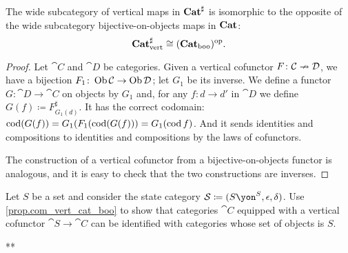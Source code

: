 \documentclass[Book-Poly]{subfiles}
\begin{document}



\begin{proposition}\label{prop.com_vert_cat_boo}
The wide subcategory of vertical maps in $\mathbf{Cat}^\sharp$ is isomorphic to the opposite of the wide subcategory bijective-on-objects maps in $\mathbf{Cat}$:
\[
\mathbf{Cat}^\sharp_{\text{vert}}\cong(\mathbf{Cat}_{\text{boo}})^{\textnormal{op}}.
\]
\end{proposition}
\begin{proof}
Let $\cat{C}$ and $\cat{D}$ be categories. Given a vertical cofunctor $F\colon\mathcal{C}\nrightarrow\mathcal{D}$, we have a bijection $F_1\colon\operatorname{Ob}\mathcal{C}\to\operatorname{Ob}\mathcal{D}$; let $G_1$ be its inverse. We define a functor $G\colon\cat{D}\to\cat{C}$ on objects by $G_1$ and, for any $f\colon d\to d'$ in $\cat{D}$ we define $G(f)\coloneqq F^\sharp_{G_1(d)}$. It has the correct codomain: $\operatorname{cod}(G(f))=G_1(F_1(\operatorname{cod}(G(f)))=G_1(\operatorname{cod} f)$. And it sends identities and compositions to identities and compositions by the laws of cofunctors.

The construction of a vertical cofunctor from a bijective-on-objects functor is analogous, and it is easy to check that the two constructions are inverses.
\end{proof}

\begin{exercise}
Let $S$ be a set and consider the state category $\cat{S}\coloneqq(S\yon^S,\epsilon,\delta)$. Use \cref{prop.com_vert_cat_boo} to show that categories $\cat{C}$ equipped with a vertical cofunctor $\cat{S}\to\cat{C}$ can be identified with categories whose set of objects is $S$.
\begin{solution}
**
\end{solution}
\end{exercise}
\end{document}
